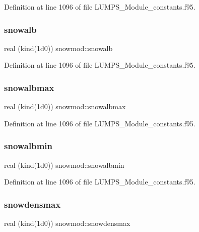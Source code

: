 Definition at line 1096 of file L\+U\+M\+P\+S\+\_\+\+Module\+\_\+constants.\+f95.

\mbox{\label{namespacesnowmod_a269fc9eb4dcd8dc77888c370c046a3c2}} 
\subsubsection{\texorpdfstring{snowalb}{snowalb}}
{\footnotesize\ttfamily real (kind(1d0)) snowmod\+::snowalb}



Definition at line 1096 of file L\+U\+M\+P\+S\+\_\+\+Module\+\_\+constants.\+f95.

\mbox{\label{namespacesnowmod_abce33f4b342130e8ac52ef51369bc801}} 
\subsubsection{\texorpdfstring{snowalbmax}{snowalbmax}}
{\footnotesize\ttfamily real (kind(1d0)) snowmod\+::snowalbmax}



Definition at line 1096 of file L\+U\+M\+P\+S\+\_\+\+Module\+\_\+constants.\+f95.

\mbox{\label{namespacesnowmod_a96e2ce7900b7310542876993d72547ef}} 
\subsubsection{\texorpdfstring{snowalbmin}{snowalbmin}}
{\footnotesize\ttfamily real (kind(1d0)) snowmod\+::snowalbmin}



Definition at line 1096 of file L\+U\+M\+P\+S\+\_\+\+Module\+\_\+constants.\+f95.

\mbox{\label{namespacesnowmod_a8a8b8429973d4227f3f1af64ebce2e79}} 
\subsubsection{\texorpdfstring{snowdensmax}{snowdensmax}}
{\footnotesize\ttfamily real (kind(1d0)) snowmod\+::snowdensmax}




